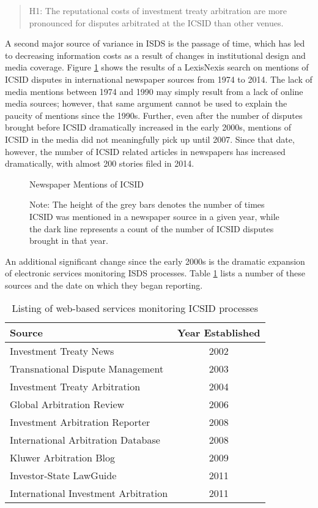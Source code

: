 \documentclass[12pt,onesided]{amsart}
\begin{document}
\begin{quote}
H1: The reputational costs of investment treaty arbitration are more pronounced for disputes arbitrated at the ICSID than other venues.
\end{quote}

A second major source of variance in ISDS is the passage of time, which has led to decreasing information costs as a result of changes in institutional design and media coverage. Figure \ref{fig:icsidMedia} shows the results of a LexisNexis search on mentions of ICSID disputes in international newspaper sources from 1974 to 2014. The lack of media mentions between 1974 and 1990 may simply result from a lack of online media sources; however, that same argument cannot be used to explain the paucity of mentions since the 1990s. Further, even after the number of disputes brought before ICSID dramatically increased in the early 2000s, mentions of ICSID in the media did not meaningfully pick up until 2007. Since that date, however, the number of ICSID related articles in newspapers has increased dramatically, with almost 200 stories filed in 2014. 

\begin{figure}[ht]
	\centering
	\caption{Newspaper Mentions of ICSID}
	\label{fig:icsidMedia}
	\resizebox{.8\textwidth}{!}{}
	\caption*{Note: The height of the grey bars denotes the number of times ICSID was mentioned in a newspaper source in a given year, while the dark line represents a count of the number of ICSID disputes brought in that year.}
\end{figure}
\FloatBarrier

An additional significant change since the early 2000s is the dramatic expansion of electronic services monitoring ISDS processes. Table \ref{tab:disputeSites} lists a number of these sources and the date on which they began reporting. 

\begin{table}[ht]
\centering
\begin{tabular}{lc}
	\hline\hline
	Source & Year Established \\
	\hline
	Investment Treaty News & 2002 \\
	Transnational Dispute Management & 2003 \\
	Investment Treaty Arbitration & 2004 \\
	Global Arbitration Review & 2006 \\
	Investment Arbitration Reporter & 2008 \\
	International Arbitration Database & 2008 \\
	Kluwer Arbitration Blog & 2009 \\
	Investor-State LawGuide & 2011 \\
	International Investment Arbitration & 2011 \\
	\hline\hline
\end{tabular}
\caption{Listing of web-based services monitoring ICSID processes}
\label{tab:disputeSites}
\end{table}
\FloatBarrier
\end{document}
